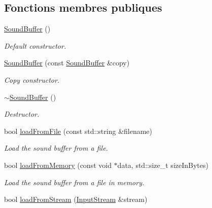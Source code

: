\subsection*{Fonctions membres publiques}
\begin{DoxyCompactItemize}
\item 
\mbox{\label{classsf_1_1SoundBuffer_a0cabfbfe19b831bf7d5c9592d92ef233}} 
\hyperlink{classsf_1_1SoundBuffer_a0cabfbfe19b831bf7d5c9592d92ef233}{Sound\+Buffer} ()
\begin{DoxyCompactList}\small\item\em Default constructor. \end{DoxyCompactList}\item 
\hyperlink{classsf_1_1SoundBuffer_aaf000fc741ff27015907e8588263f4a6}{Sound\+Buffer} (const \hyperlink{classsf_1_1SoundBuffer}{Sound\+Buffer} \&copy)
\begin{DoxyCompactList}\small\item\em Copy constructor. \end{DoxyCompactList}\item 
\mbox{\label{classsf_1_1SoundBuffer_aea240161724ffba74a0d6a9e277d3cd5}} 
\hyperlink{classsf_1_1SoundBuffer_aea240161724ffba74a0d6a9e277d3cd5}{$\sim$\+Sound\+Buffer} ()
\begin{DoxyCompactList}\small\item\em Destructor. \end{DoxyCompactList}\item 
bool \hyperlink{classsf_1_1SoundBuffer_a2be6a8025c97eb622a7dff6cf2594394}{load\+From\+File} (const std\+::string \&filename)
\begin{DoxyCompactList}\small\item\em Load the sound buffer from a file. \end{DoxyCompactList}\item 
bool \hyperlink{classsf_1_1SoundBuffer_af8cfa5599739a7edae69c5cba273d33f}{load\+From\+Memory} (const void $\ast$data, std\+::size\+\_\+t size\+In\+Bytes)
\begin{DoxyCompactList}\small\item\em Load the sound buffer from a file in memory. \end{DoxyCompactList}\item 
bool \hyperlink{classsf_1_1SoundBuffer_ad292156b1e01f6dabd4c0c277d5e079e}{load\+From\+Stream} (\hyperlink{classsf_1_1InputStream}{Input\+Stream} \&stream)

\end{DoxyCompactItemize}
